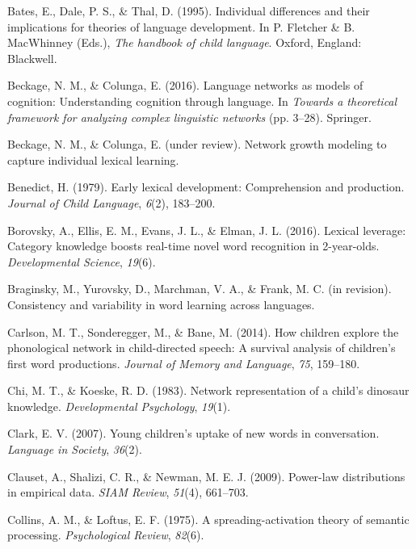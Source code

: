 \documentclass[english,floatsintext,man]{apa6}
\theoremstyle{definition}
\theoremstyle{definition}
\theoremstyle{definition}
\theoremstyle{remark}
\begin{document}
\hypertarget{ref-bates1995}{}
Bates, E., Dale, P. S., \& Thal, D. (1995). Individual differences and
their implications for theories of language development. In P. Fletcher
\& B. MacWhinney (Eds.), \emph{The handbook of child language}. Oxford,
England: Blackwell.

\hypertarget{ref-beckage2016}{}
Beckage, N. M., \& Colunga, E. (2016). Language networks as models of
cognition: Understanding cognition through language. In \emph{Towards a
theoretical framework for analyzing complex linguistic networks} (pp.
3--28). Springer.

\hypertarget{ref-beckage}{}
Beckage, N. M., \& Colunga, E. (under review). Network growth modeling
to capture individual lexical learning.

\hypertarget{ref-benedict1979}{}
Benedict, H. (1979). Early lexical development: Comprehension and
production. \emph{Journal of Child Language}, \emph{6}(2), 183--200.

\hypertarget{ref-borovsky2016}{}
Borovsky, A., Ellis, E. M., Evans, J. L., \& Elman, J. L. (2016).
Lexical leverage: Category knowledge boosts real-time novel word
recognition in 2-year-olds. \emph{Developmental Science}, \emph{19}(6).

\hypertarget{ref-braginsky}{}
Braginsky, M., Yurovsky, D., Marchman, V. A., \& Frank, M. C. (in
revision). Consistency and variability in word learning across
languages.

\hypertarget{ref-carlson2014}{}
Carlson, M. T., Sonderegger, M., \& Bane, M. (2014). How children
explore the phonological network in child-directed speech: A survival
analysis of children's first word productions. \emph{Journal of Memory
and Language}, \emph{75}, 159--180.

\hypertarget{ref-chi1983}{}
Chi, M. T., \& Koeske, R. D. (1983). Network representation of a child's
dinosaur knowledge. \emph{Developmental Psychology}, \emph{19}(1).

\hypertarget{ref-clark2007}{}
Clark, E. V. (2007). Young children's uptake of new words in
conversation. \emph{Language in Society}, \emph{36}(2).

\hypertarget{ref-clauset09}{}
Clauset, A., Shalizi, C. R., \& Newman, M. E. J. (2009). Power-law
distributions in empirical data. \emph{SIAM Review}, \emph{51}(4),
661--703.

\hypertarget{ref-collins1975}{}
Collins, A. M., \& Loftus, E. F. (1975). A spreading-activation theory
of semantic processing. \emph{Psychological Review}, \emph{82}(6).
\end{document}
